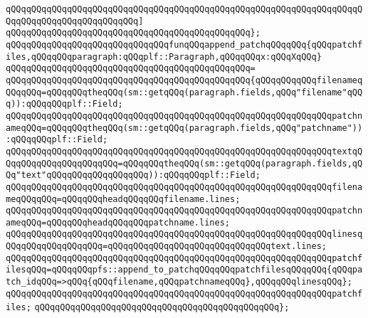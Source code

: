 \verb|qQQqqQQqqQQqqQQqqQQqqQQqqQQqqQQqqQQqqQQqqQQqqQQqqQQqqQQqqQQqqQQqqQQqqQQqqQQqqQQqqQQqqQQqqQQqqQQq]|\newline
\verb|qQQqqQQqqQQqqQQqqQQqqQQqqQQqqQQqqQQqqQQqqQQqqQQq};|\newline
\newline
\newline
\newline
\verb|qQQqqQQqqQQqqQQqqQQqqQQqqQQqqQQqfunqQQqappend_patchqQQqqQQq{qQQqpatchfiles,qQQqqQQqparagraph:qQQqplf::Paragraph,qQQqqQQqx:qQQqXqQQq}|\newline
\verb|qQQqqQQqqQQqqQQqqQQqqQQqqQQqqQQqqQQqqQQqqQQqqQQq=|\newline
\verb|qQQqqQQqqQQqqQQqqQQqqQQqqQQqqQQqqQQqqQQqqQQqqQQq{qQQqqQQqqQQqfilenameqQQqqQQq=qQQqqQQqtheqQQq(sm::getqQQq(paragraph.fields,qQQq"filename"qQQq)):qQQqqQQqplf::Field;|\newline
\verb|qQQqqQQqqQQqqQQqqQQqqQQqqQQqqQQqqQQqqQQqqQQqqQQqqQQqqQQqqQQqqQQqpatchnameqQQq=qQQqqQQqtheqQQq(sm::getqQQq(paragraph.fields,qQQq"patchname")):qQQqqQQqplf::Field;|\newline
\verb|qQQqqQQqqQQqqQQqqQQqqQQqqQQqqQQqqQQqqQQqqQQqqQQqqQQqqQQqqQQqqQQqtextqQQqqQQqqQQqqQQqqQQqqQQq=qQQqqQQqtheqQQq(sm::getqQQq(paragraph.fields,qQQq"text"qQQqqQQqqQQqqQQqqQQq)):qQQqqQQqplf::Field;|\newline
\newline
\verb|qQQqqQQqqQQqqQQqqQQqqQQqqQQqqQQqqQQqqQQqqQQqqQQqqQQqqQQqqQQqqQQqfilenameqQQqqQQq=qQQqqQQqheadqQQqqQQqfilename.lines;|\newline
\verb|qQQqqQQqqQQqqQQqqQQqqQQqqQQqqQQqqQQqqQQqqQQqqQQqqQQqqQQqqQQqqQQqpatchnameqQQq=qQQqqQQqheadqQQqqQQqpatchname.lines;|\newline
\verb|qQQqqQQqqQQqqQQqqQQqqQQqqQQqqQQqqQQqqQQqqQQqqQQqqQQqqQQqqQQqqQQqlinesqQQqqQQqqQQqqQQqqQQq=qQQqqQQqqQQqqQQqqQQqqQQqqQQqqQQqtext.lines;|\newline
\newline
\verb|qQQqqQQqqQQqqQQqqQQqqQQqqQQqqQQqqQQqqQQqqQQqqQQqqQQqqQQqqQQqqQQqpatchfilesqQQq=qQQqqQQqpfs::append_to_patchqQQqqQQqpatchfilesqQQqqQQq{qQQqpatch_idqQQq=>qQQq{qQQqfilename,qQQqpatchnameqQQq},qQQqqQQqlinesqQQq};|\newline
\newline
\verb|qQQqqQQqqQQqqQQqqQQqqQQqqQQqqQQqqQQqqQQqqQQqqQQqqQQqqQQqqQQqqQQqpatchfiles;|\newline
\verb|qQQqqQQqqQQqqQQqqQQqqQQqqQQqqQQqqQQqqQQqqQQqqQQq};|\newline
\newline
